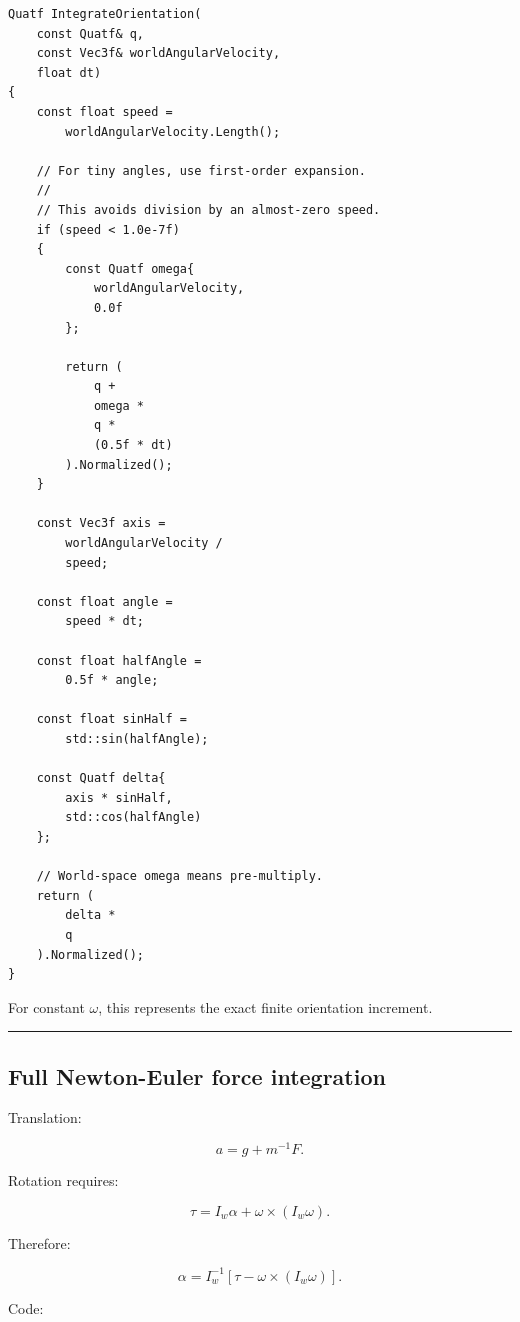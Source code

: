 \begin{verbatim}
Quatf IntegrateOrientation(
    const Quatf& q,
    const Vec3f& worldAngularVelocity,
    float dt)
{
    const float speed =
        worldAngularVelocity.Length();

    // For tiny angles, use first-order expansion.
    //
    // This avoids division by an almost-zero speed.
    if (speed < 1.0e-7f)
    {
        const Quatf omega{
            worldAngularVelocity,
            0.0f
        };

        return (
            q +
            omega *
            q *
            (0.5f * dt)
        ).Normalized();
    }

    const Vec3f axis =
        worldAngularVelocity /
        speed;

    const float angle =
        speed * dt;

    const float halfAngle =
        0.5f * angle;

    const float sinHalf =
        std::sin(halfAngle);

    const Quatf delta{
        axis * sinHalf,
        std::cos(halfAngle)
    };

    // World-space omega means pre-multiply.
    return (
        delta *
        q
    ).Normalized();
}
\end{verbatim}

For constant \(\omega\), this represents the exact finite orientation increment.

\begin{center}\rule{0.5\linewidth}{0.5pt}\end{center}

\subsection{Full Newton-Euler force integration}\label{06-engine-ii-ch039-full-newton-euler-force-integration}

\hypertarget{06-engine-ii-ch039-full-newton-euler-force-integration}{}

Translation:

\[
a
=
g+
m^{-1}F.
\]

Rotation requires:

\[
\tau
=
I_w\alpha+
\omega\times(I_w\omega).
\]

Therefore:

\[
\boxed{
\alpha
=
I_w^{-1}
[
\tau-
\omega\times(I_w\omega)
].
}
\]

Code:

